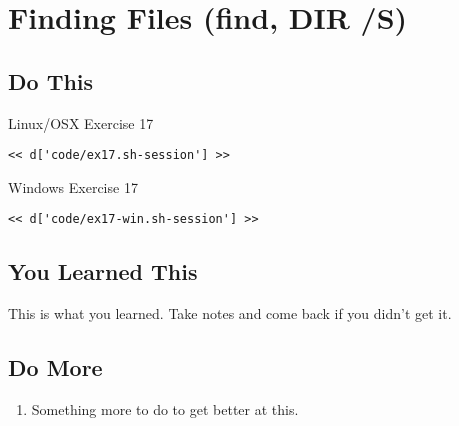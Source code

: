 \chapter{Finding Files (find, DIR /S)}

\section{Do This}

\begin{code}{Linux/OSX Exercise 17}
\begin{Verbatim}
<< d['code/ex17.sh-session'] >>
\end{Verbatim}
\end{code}

\begin{code}{Windows Exercise 17}
\begin{Verbatim}
<< d['code/ex17-win.sh-session'] >>
\end{Verbatim}
\end{code}

\section{You Learned This}

This is what you learned.  Take notes and come back if you didn't get it.

\section{Do More}

\begin{enumerate}
\item Something more to do to get better at this.
\end{enumerate}

